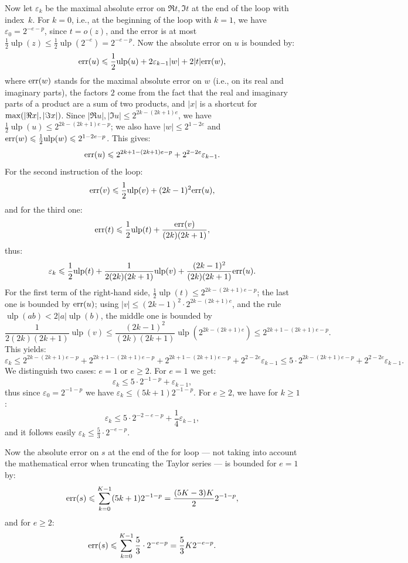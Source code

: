 \documentclass [11pt]{article}
\newcommand {\Ulp}{{\operatorname {ulp}}}
\renewcommand {\leq}{\leqslant}
\renewcommand {\geq}{\geqslant}
\begin{document}
Now let $\varepsilon_k$ be the maximal absolute error on $\Re t, \Im t$ at the
end of the loop with index~$k$.
For $k=0$, i.e., at the beginning of the loop with $k=1$, we have
$\varepsilon_0 = 2^{-e-p}$, since $t = o(z)$, and the error is at most
$\frac{1}{2} \Ulp(z) \leq \frac{1}{2} \Ulp(2^{-e}) = 2^{-e-p}$.
Now the absolute error on $u$ is bounded by:
\[ {\rm err}(u) \leq \frac{1}{2} \Ulp(u) + 2 \varepsilon_{k-1} |w| + 2 |t| {\rm err}(w), \]
where ${\rm err}(w)$ stands for the maximal absolute error on $w$ (i.e.,
on its real and imaginary parts), the factors $2$ come from the fact
that the real and imaginary parts of a product are a sum of two products,
and $|x|$ is a shortcut for ${\rm max}(|\Re x|, |\Im x|)$.
Since $|\Re u|, |\Im u| \leq 2^{2k-(2k+1)e}$, we have
$\frac{1}{2} \Ulp(u) \leq 2^{2k-(2k+1)e-p}$;
we also have $|w| \leq 2^{1-2e}$ and ${\rm err}(w) \leq \frac{1}{2}
\Ulp(w) \leq 2^{1-2e-p}$. This gives:
\[ {\rm err}(u) \leq 2^{2k+1-(2k+1)e-p} + 2^{2-2e} \varepsilon_{k-1}. \]
For the second instruction of the loop:
\[ {\rm err}(v) \leq \frac{1}{2} \Ulp(v) + (2k-1)^2 {\rm err}(u), \]
and for the third one:
\[ {\rm err}(t) \leq \frac{1}{2} \Ulp(t) + \frac{{\rm err}(v)}{(2k)(2k+1)}, \]
thus:
\[ \varepsilon_k \leq \frac{1}{2} \Ulp(t) +
  \frac{1}{2(2k)(2k+1)} \Ulp(v) + \frac{(2k-1)^2}{(2k)(2k+1)} {\rm err}(u). \]
For the first term of the right-hand side,
$\frac{1}{2} \Ulp(t) \leq 2^{2k-(2k+1)e-p}$;
the last one is bounded by ${\rm err}(u)$;
using $|v| \leq (2k-1)^2 \cdot 2^{2k-(2k+1)e}$, and
the rule $\Ulp(ab) < 2 |a| \Ulp(b)$,
the middle one is bounded by
\[ \frac{1}{2(2k)(2k+1)} \Ulp(v) \leq
  \frac{(2k-1)^2}{(2k)(2k+1)} \Ulp(2^{2k-(2k+1)e})
  \leq 2^{2k+1-(2k+1)e-p}. \]
This yields:
\[ \varepsilon_k \leq 2^{2k-(2k+1)e-p} + 2^{2k+1-(2k+1)e-p}
  + 2^{2k+1-(2k+1)e-p} + 2^{2-2e} \varepsilon_{k-1}
  \leq 5 \cdot 2^{2k-(2k+1)e-p} + 2^{2-2e} \varepsilon_{k-1}. \]
We distinguish two cases: $e=1$ or $e \geq 2$.
For $e=1$ we get:
\[ \varepsilon_k \leq 5 \cdot 2^{-1-p} + \varepsilon_{k-1}, \]
thus since $\varepsilon_0 = 2^{-1-p}$ we have
$\varepsilon_k \leq (5k+1) 2^{-1-p}$.
For $e \geq 2$, we have for $k \geq 1$:
\[ \varepsilon_k \leq 5 \cdot 2^{-2-e-p} + \frac{1}{4} \varepsilon_{k-1}, \]
and it follows easily $\varepsilon_k \leq \frac{5}{3} \cdot 2^{-e-p}$.

Now the absolute error on $s$ at the end of the for loop --- not taking into
account the mathematical error when truncating the Taylor series ---
is bounded for $e=1$ by:
\[ {\rm err}(s) \leq \sum_{k=0}^{K-1} (5k+1) 2^{-1-p} = \frac{(5K-3)K}{2} 2^{-1-p}, \]
and for $e \geq 2$:
\[ {\rm err}(s) \leq \sum_{k=0}^{K-1} \frac{5}{3} \cdot 2^{-e-p} =
  \frac{5}{3} K 2^{-e-p}. \]
\end{document}

